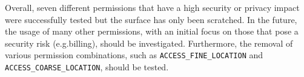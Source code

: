 Overall, seven different permissions that have a high security or privacy impact were successfully tested but the surface has only been scratched. In the future, the usage of many other permissions, with an initial focus on those that pose a security risk (e.g.billing), should be investigated. Furthermore, the removal of various permission combinations, such as \texttt{ACCESS\_FINE\_LOCATION} and \texttt{ACCESS\_COARSE\_LOCATION}, should be tested.  
